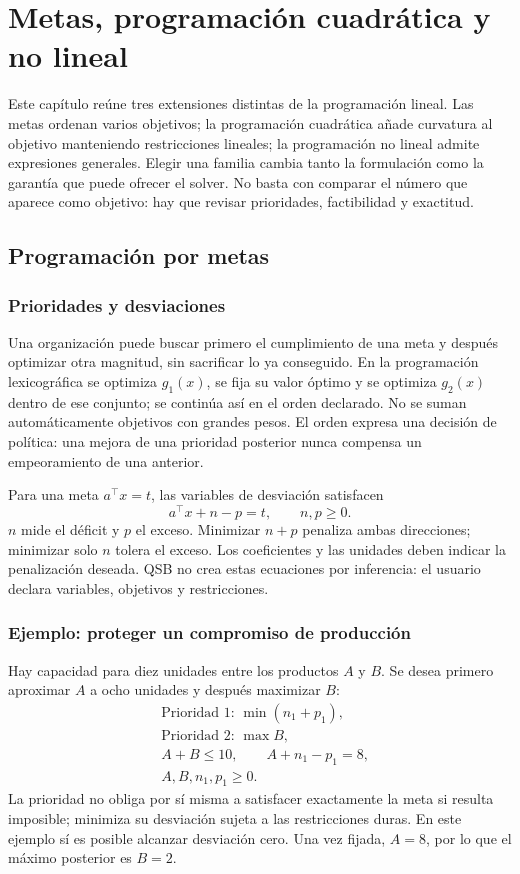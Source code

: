 \chapter{Metas, programación cuadrática y no lineal}
\label{chap:optimizacion-avanzada}

Este capítulo reúne tres extensiones distintas de la programación lineal. Las
metas ordenan varios objetivos; la programación cuadrática añade curvatura al
objetivo manteniendo restricciones lineales; la programación no lineal admite
expresiones generales. Elegir una familia cambia tanto la formulación como la
garantía que puede ofrecer el solver. No basta con comparar el número que
aparece como objetivo: hay que revisar prioridades, factibilidad y exactitud.

\section{Programación por metas}
\subsection{Prioridades y desviaciones}
Una organización puede buscar primero el cumplimiento de una meta y después
optimizar otra magnitud, sin sacrificar lo ya conseguido. En la programación
lexicográfica se optimiza \(g_1(x)\), se fija su valor óptimo y se optimiza
\(g_2(x)\) dentro de ese conjunto; se continúa así en el orden declarado.
No se suman automáticamente objetivos con grandes pesos. El orden expresa
una decisión de política: una mejora de una prioridad posterior nunca compensa
un empeoramiento de una anterior.

Para una meta \(a^\top x=t\), las variables de desviación satisfacen
\[
 a^\top x+n-p=t,\qquad n,p\geq0.
\]
\(n\) mide el déficit y \(p\) el exceso. Minimizar \(n+p\) penaliza ambas
direcciones; minimizar solo \(n\) tolera el exceso. Los coeficientes y las
unidades deben indicar la penalización deseada. QSB no crea estas ecuaciones
por inferencia: el usuario declara variables, objetivos y restricciones.

\subsection{Ejemplo: proteger un compromiso de producción}
Hay capacidad para diez unidades entre los productos \(A\) y \(B\). Se desea
primero aproximar \(A\) a ocho unidades y después maximizar \(B\):
\[
\begin{aligned}
 &\text{Prioridad 1: }\min(n_1+p_1),\\
 &\text{Prioridad 2: }\max B,\\
 &A+B\leq10,\qquad A+n_1-p_1=8,\\
 &A,B,n_1,p_1\geq0.
\end{aligned}
\]
La prioridad no obliga por sí misma a satisfacer exactamente la meta si
resulta imposible; minimiza su desviación sujeta a las restricciones duras.
En este ejemplo sí es posible alcanzar desviación cero. Una vez fijada,
\(A=8\), por lo que el máximo posterior es \(B=2\).

